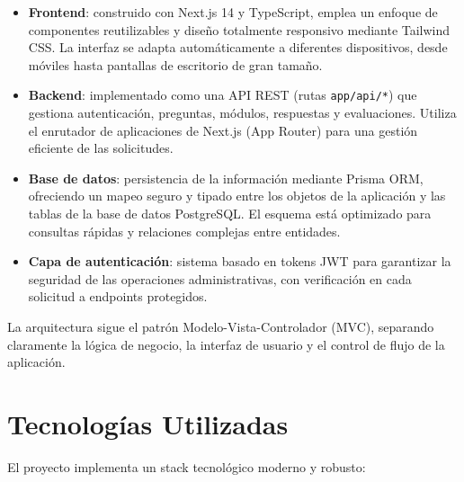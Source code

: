 \documentclass[12pt,a4paper]{report}
\begin{document}
\begin{itemize}[leftmargin=*]
    \item \textbf{Frontend}: construido con Next.js 14 y TypeScript, emplea un enfoque de componentes reutilizables y diseño totalmente responsivo mediante Tailwind CSS. La interfaz se adapta automáticamente a diferentes dispositivos, desde móviles hasta pantallas de escritorio de gran tamaño.
    
    \item \textbf{Backend}: implementado como una API REST (rutas \texttt{app/api/*}) que gestiona autenticación, preguntas, módulos, respuestas y evaluaciones. Utiliza el enrutador de aplicaciones de Next.js (App Router) para una gestión eficiente de las solicitudes.
    
    \item \textbf{Base de datos}: persistencia de la información mediante Prisma ORM, ofreciendo un mapeo seguro y tipado entre los objetos de la aplicación y las tablas de la base de datos PostgreSQL. El esquema está optimizado para consultas rápidas y relaciones complejas entre entidades.
    
    \item \textbf{Capa de autenticación}: sistema basado en tokens JWT para garantizar la seguridad de las operaciones administrativas, con verificación en cada solicitud a endpoints protegidos.
\end{itemize}

La arquitectura sigue el patrón Modelo-Vista-Controlador (MVC), separando claramente la lógica de negocio, la interfaz de usuario y el control de flujo de la aplicación.

\chapter{Tecnologías Utilizadas}
El proyecto implementa un stack tecnológico moderno y robusto:
\end{document}
